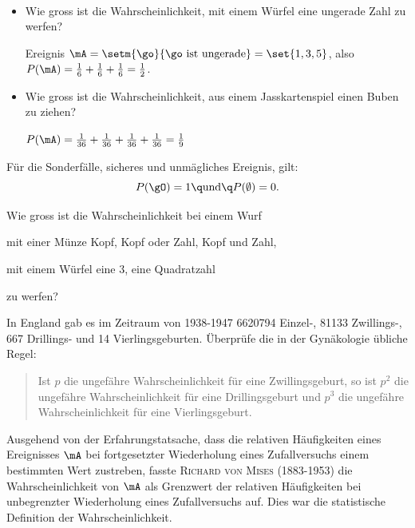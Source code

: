 \documentclass[%
11pt,%
twoside,%
titlepage,%
german,%
headsepline%
]{scrartcl}
\begin{document}
\begin{bsps}
\ \\[-4ex]
\begin{itemize}
\item Wie gross ist die Wahrscheinlichkeit, mit einem Würfel eine ungerade Zahl zu werfen?

Ereignis $\mA=\setm{\go}{\go\text{ ist ungerade}}=\set{1,3,5}$, also $P(\mA)=\frac{1}{6}+\frac{1}{6}+\frac{1}{6}=\frac{1}{2}$.
\item Wie gross ist die Wahrscheinlichkeit, aus einem Jasskartenspiel einen Buben zu ziehen?

$P(\mA)=\frac{1}{36}+\frac{1}{36}+\frac{1}{36}+\frac{1}{36}=\frac{1}{9}$
\end{itemize}
\end{bsps}

\begin{bem}
Für die Sonderfälle, sicheres und unmägliches Ereignis, gilt:
$$P(\gO)=1\q\text{und}\q P(\emptyset)=0.$$
\end{bem}

\begin{ueb}
Wie gross ist die Wahrscheinlichkeit bei einem Wurf
\begin{enumeratea}
\item mit einer Münze Kopf, Kopf oder Zahl, Kopf und Zahl,
\item mit einem Würfel eine 3, eine Quadratzahl
\end{enumeratea}
zu werfen?
\end{ueb}

\begin{ueb}
In England gab es im Zeitraum von 1938-1947 6620794 Einzel-, 81133 Zwillings-, 667 Drillings- und 14 Vierlingsgeburten. Überprüfe die in der Gy\-nä\-ko\-lo\-gie übliche Regel:
\begin{quote}
Ist $p$ die ungefähre Wahrscheinlichkeit für eine Zwillingsgeburt, so ist $p^2$ die ungefähre Wahrscheinlichkeit für eine Drillingsgeburt und $p^3$ die ungefähre Wahrscheinlichkeit für eine Vierlingsgeburt.
\end{quote}
\end{ueb}

Ausgehend von der Erfahrungstatsache, dass die relativen Häufigkeiten eines Ereignisses $\mA$ bei fortgesetzter Wiederholung eines Zufallversuchs einem bestimmten Wert zustreben, fasste \textsc{Richard von Mises} (1883-1953) die Wahrscheinlichkeit von $\mA$ als Grenzwert der relativen Häufigkeiten bei unbegrenzter Wiederholung eines Zufallversuchs auf. Dies war die statistische Definition der Wahrscheinlichkeit.
\end{document}
